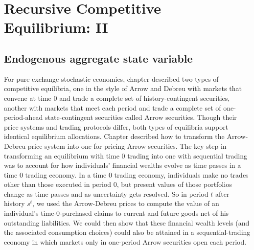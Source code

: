 



%
%
%
%
%








\def\sumst{{\sum_{t=0}^\infty \sum_{s^t}}}
\def\Ast{{A_t(s^t)}}
\def\cst{{c_t(s^t)}}
\def\kst{{k_t(s^{t-1})}}
\def\kstone{{k_{t+1}(s^t)}}
\def\nst{{n_t(s^t)}}
\def\xst{{x_t(s^t)}}
\def\qst{{q_t^0(s^t)}}
\def\qstone{{q_{t-1}^0(s^{t-1})}}
\def\wst{{w_t^0(s^t)}}
\def\rst{{r_t^0(s^t)}}
\def\rstilde{{r_t^0(\tilde s^t)}}
\def\pist{{\pi_t(s^t)}}
\def\must{{\mu_t(s^t)}}
\def\mustone{{\mu_{t+1}(s^{t+1})}}

\def\thetast{{\theta_{t}(s^{t})}}
\def\thetastilde{{\theta_{t}(\tilde s^{t})}}
\def\thetastone{{\theta_{t-1}(s^{t-1})}}
\def\lhake{{\Bigl[}}




\chapter{Recursive Competitive Equilibrium: II\label{growth1}}
\section{Endogenous aggregate state variable}  %
For pure exchange stochastic economies, chapter   described
two types of competitive equilibria, one  in the style of Arrow and Debreu
with markets that convene
at time $0$ and trade
a complete set of history-contingent securities, another with markets
that meet each period and trade a complete set
of one-period-ahead state-contingent securities called  Arrow
securities.  Though their price systems and trading protocols
differ, both types of equilibria support identical
equilibrium allocations.
Chapter  described how to transform the Arrow-Debreu price
system into one for pricing Arrow securities.
 The key
step in transforming an equilibrium with time $0$ trading into one
with sequential trading was to account for how individuals' financial wealths
evolve as time passes in a time $0$ trading economy.
In a time $0$ trading economy, individuals make no 
 trades other than those executed in period $0$, but  present
values of those portfolios change as time passes and as uncertainty gets
resolved.
So in period $t$ after  history $s^t$, we used the Arrow-Debreu
prices to compute the value of an individual's time-$0$-purchased
claims to current and future goods net of his outstanding liabilities.
We could then show that these financial wealth levels (and the
associated consumption choices) could also be attained in a sequential-trading
economy in which  markets only in one-period Arrow securities  open  each period.


